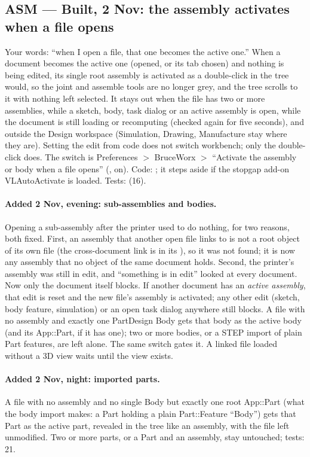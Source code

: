 \subsection{ASM --- Built, 2 Nov: the assembly activates when a file opens}\label{sec:asm-autoactivate-built}

Your words: ``when I open a file, that one becomes the active one.'' When a document becomes the active one
(opened, or its tab chosen) and nothing is being edited, its single root assembly is activated as a double-click
in the tree would, so the joint and assemble tools are no longer grey, and the tree scrolls to it with nothing left
selected. It stays out when the file has two or more assemblies, while a sketch, body, task dialog or an active
assembly is open, while the document is still loading or recomputing (checked again for five seconds), and outside
the Design workspace (Simulation, Drawing, Manufacture stay where they are). Setting the edit from code does not
switch workbench; only the double-click does. The switch is Preferences $>$ BruceWorx $>$ ``Activate the assembly
or body when a file opens'' (, on). Code: ; it
steps aside if the stopgap add-on VLAutoActivate is loaded. Tests:  (16).

\paragraph{Added 2 Nov, evening: sub-assemblies and bodies.} Opening a sub-assembly after the printer used to do
nothing, for two reasons, both fixed. First, an assembly that another open file links to is not a root object of its
own file (the cross-document link is in its ), so it was not found; it is now any assembly that no
object of the same document holds. Second, the printer's assembly was still in edit, and ``something is in edit''
looked at every document. Now only the document itself blocks. If another document has an \emph{active assembly},
that edit is reset and the new file's assembly is activated; any other edit (sketch, body feature, simulation) or an
open task dialog anywhere still blocks. A file with no assembly and exactly one PartDesign Body gets that body as the
active body (and its App::Part, if it has one); two or more bodies, or a STEP import of plain Part features, are
left alone. The same switch gates it. A linked file loaded without a 3D view waits until the view exists.


\paragraph{Added 2 Nov, night: imported parts.} A file with no assembly and no single Body but exactly one root
App::Part (what the body import makes: a Part holding a plain Part::Feature ``Body'') gets that Part as the active
part, revealed in the tree like an assembly, with the file left unmodified. Two or more parts, or a Part and an assembly, stay untouched; tests: 21.
